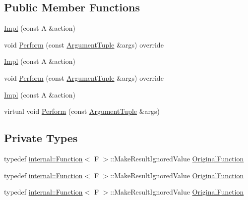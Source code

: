 \subsection*{Public Member Functions}
\begin{DoxyCompactItemize}
\item 
\mbox{\hyperlink{classtesting_1_1internal_1_1_ignore_result_action_1_1_impl_a0252ee58746d81d31b92526b2336892e}{Impl}} (const A \&action)
\item 
void \mbox{\hyperlink{classtesting_1_1internal_1_1_ignore_result_action_1_1_impl_a5fa77ae51ba5d05e01d338910df24128}{Perform}} (const \mbox{\hyperlink{classtesting_1_1_action_interface_af72720d864da4d606629e83edc003511}{Argument\+Tuple}} \&args) override
\item 
\mbox{\hyperlink{classtesting_1_1internal_1_1_ignore_result_action_1_1_impl_a0252ee58746d81d31b92526b2336892e}{Impl}} (const A \&action)
\item 
void \mbox{\hyperlink{classtesting_1_1internal_1_1_ignore_result_action_1_1_impl_a5fa77ae51ba5d05e01d338910df24128}{Perform}} (const \mbox{\hyperlink{classtesting_1_1_action_interface_af72720d864da4d606629e83edc003511}{Argument\+Tuple}} \&args) override
\item 
\mbox{\hyperlink{classtesting_1_1internal_1_1_ignore_result_action_1_1_impl_a0252ee58746d81d31b92526b2336892e}{Impl}} (const A \&action)
\item 
virtual void \mbox{\hyperlink{classtesting_1_1internal_1_1_ignore_result_action_1_1_impl_ad2b7d520f2d50cf640da1a039a81684f}{Perform}} (const \mbox{\hyperlink{classtesting_1_1_action_interface_af72720d864da4d606629e83edc003511}{Argument\+Tuple}} \&args)
\end{DoxyCompactItemize}
\subsection*{Private Types}
\begin{DoxyCompactItemize}
\item 
typedef \mbox{\hyperlink{structtesting_1_1internal_1_1_function}{internal\+::\+Function}}$<$ F $>$\+::Make\+Result\+Ignored\+Value \mbox{\hyperlink{classtesting_1_1internal_1_1_ignore_result_action_1_1_impl_a00db745de37ebae1ee631240098bc2b1}{Original\+Function}}
\item 
typedef \mbox{\hyperlink{structtesting_1_1internal_1_1_function}{internal\+::\+Function}}$<$ F $>$\+::Make\+Result\+Ignored\+Value \mbox{\hyperlink{classtesting_1_1internal_1_1_ignore_result_action_1_1_impl_a00db745de37ebae1ee631240098bc2b1}{Original\+Function}}
\item 
typedef \mbox{\hyperlink{structtesting_1_1internal_1_1_function}{internal\+::\+Function}}$<$ F $>$\+::Make\+Result\+Ignored\+Value \mbox{\hyperlink{classtesting_1_1internal_1_1_ignore_result_action_1_1_impl_a00db745de37ebae1ee631240098bc2b1}{Original\+Function}}
\end{DoxyCompactItemize}
